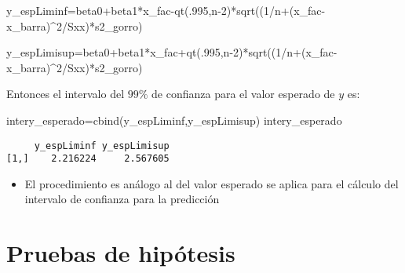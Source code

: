 \documentclass[
  a4paper,
  oneside,
  openany]{book}
\newenvironment{Shaded}{\begin{snugshade}}{\end{snugshade}}
\newcommand{\DecValTok}[1]{\textcolor[rgb]{0.00,0.00,0.81}{#1}}
\newcommand{\FunctionTok}[1]{\textcolor[rgb]{0.00,0.00,0.00}{#1}}
\newcommand{\NormalTok}[1]{#1}
\newcommand{\OtherTok}[1]{\textcolor[rgb]{0.56,0.35,0.01}{#1}}
\newcommand{\SpecialCharTok}[1]{\textcolor[rgb]{0.00,0.00,0.00}{#1}}
\providecommand{\tightlist}{%
  \setlength{\itemsep}{0pt}\setlength{\parskip}{0pt}}
\begin{document}
\begin{Shaded}
\begin{Highlighting}[]
\NormalTok{y\_espLiminf}\OtherTok{=}\NormalTok{beta0}\SpecialCharTok{+}\NormalTok{beta1}\SpecialCharTok{*}\NormalTok{x\_fac}\SpecialCharTok{{-}}\FunctionTok{qt}\NormalTok{(.}\DecValTok{995}\NormalTok{,n}\DecValTok{{-}2}\NormalTok{)}\SpecialCharTok{*}\FunctionTok{sqrt}\NormalTok{((}\DecValTok{1}\SpecialCharTok{/}\NormalTok{n}\SpecialCharTok{+}\NormalTok{(x\_fac}\SpecialCharTok{{-}}\NormalTok{x\_barra)}\SpecialCharTok{\^{}}\DecValTok{2}\SpecialCharTok{/}\NormalTok{Sxx)}\SpecialCharTok{*}\NormalTok{s2\_gorro)}

\NormalTok{y\_espLimisup}\OtherTok{=}\NormalTok{beta0}\SpecialCharTok{+}\NormalTok{beta1}\SpecialCharTok{*}\NormalTok{x\_fac}\SpecialCharTok{+}\FunctionTok{qt}\NormalTok{(.}\DecValTok{995}\NormalTok{,n}\DecValTok{{-}2}\NormalTok{)}\SpecialCharTok{*}\FunctionTok{sqrt}\NormalTok{((}\DecValTok{1}\SpecialCharTok{/}\NormalTok{n}\SpecialCharTok{+}\NormalTok{(x\_fac}\SpecialCharTok{{-}}\NormalTok{x\_barra)}\SpecialCharTok{\^{}}\DecValTok{2}\SpecialCharTok{/}\NormalTok{Sxx)}\SpecialCharTok{*}\NormalTok{s2\_gorro)}
\end{Highlighting}
\end{Shaded}

Entonces el intervalo del \(99\%\) de confianza para el valor esperado de \(y\) es:

\begin{Shaded}
\begin{Highlighting}[]
\NormalTok{intery\_esperado}\OtherTok{=}\FunctionTok{cbind}\NormalTok{(y\_espLiminf,y\_espLimisup) }
\NormalTok{intery\_esperado}
\end{Highlighting}
\end{Shaded}

\begin{verbatim}
     y_espLiminf y_espLimisup
[1,]    2.216224     2.567605
\end{verbatim}

\begin{itemize}
\tightlist
\item
  El procedimiento es análogo al del valor esperado se aplica para el cálculo del intervalo de confianza para la predicción
\end{itemize}

\hypertarget{pruebas-de-hipuxf3tesis}{%
\chapter{Pruebas de hipótesis}\label{pruebas-de-hipuxf3tesis}}
\end{document}
